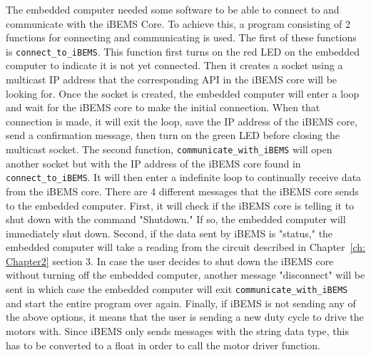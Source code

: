 The embedded computer needed some software to be able to connect to and communicate with the iBEMS Core. To achieve this, a program consisting of 2 functions for connecting and communicating is used.
\medbreak
The first of these functions is \texttt{connect\_to\_iBEMS}. This function first turns on the red LED on the embedded computer to indicate it is not yet connected. Then it creates a socket using a multicast IP address that the corresponding API in the iBEMS core will be looking for. Once the socket is created, the embedded computer will enter a loop and wait for the iBEMS core to make the initial connection. When that connection is made, it will exit the loop, save the IP address of the iBEMS core, send a confirmation message, then turn on the green LED before closing the multicast socket.
\medbreak
The second function, \texttt{communicate\_with\_iBEMS} will open another socket but with the IP address of the iBEMS core found in \texttt{connect\_to\_iBEMS}. It will then enter a indefinite loop to continually receive data from the iBEMS core. There are 4 different messages that the iBEMS core sends to the embedded computer. First, it will check if the iBEMS core is telling it to shut down with the command "Shutdown." If so, the embedded computer will immediately shut down. Second, if the data sent by iBEMS is "status," the embedded computer will take a reading from the circuit described in Chapter~\ref{ch: Chapter2} section 3. In case the user decides to shut down the iBEMS core without turning off the embedded computer, another message "disconnect" will be sent in which case the embedded computer will exit \texttt{communicate\_with\_iBEMS} and start the entire program over again. Finally, if iBEMS is not sending any of the above options, it means that the user is sending a new duty cycle to drive the motors with. Since iBEMS only sends messages with the string data type, this has to be converted to a float in order to call the motor driver function. 
